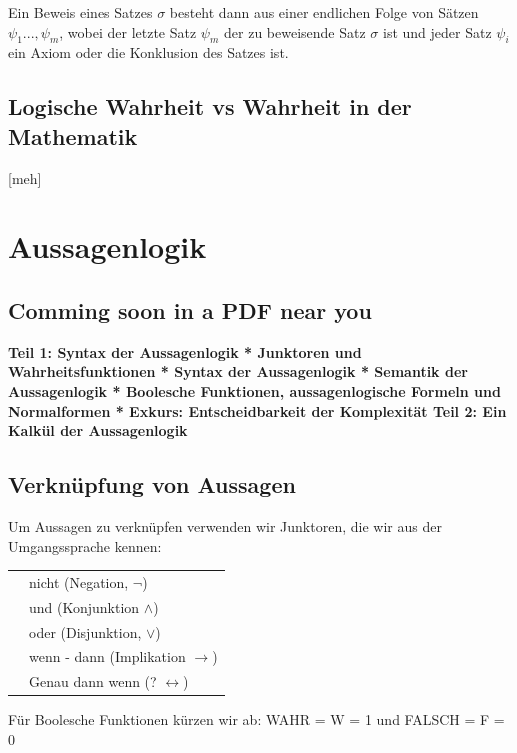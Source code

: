 \documentclass[12pt,a4paper]{article} %
\begin{document}
Ein Beweis eines Satzes $\sigma$ besteht dann aus einer endlichen Folge von Sätzen $\psi_1..., \psi_m$, wobei der letzte Satz $\psi_m$ der zu beweisende Satz $\sigma$ ist und jeder Satz $\psi_i$ ein Axiom oder die Konklusion des Satzes ist.

\subsection{Logische Wahrheit vs Wahrheit in der Mathematik}
[meh]

\section{Aussagenlogik}

\subsection{Comming soon in a PDF near you}
\bfseries{Teil 1: Syntax der Aussagenlogik} \newline
* Junktoren und Wahrheitsfunktionen\newline
* Syntax der Aussagenlogik \newline
* Semantik der Aussagenlogik \newline
* Boolesche Funktionen, aussagenlogische Formeln und Normalformen \newline
* Exkurs: Entscheidbarkeit der Komplexität \newline
\bfseries{Teil 2: Ein Kalkül der Aussagenlogik} \newline
[meh]

\subsection{Verknüpfung von Aussagen}
Um Aussagen zu verknüpfen verwenden wir Junktoren, die wir aus der Umgangssprache kennen:
\begin{tabular}{l l}
	& nicht (Negation, $\neg$) \\
	& und (Konjunktion $\wedge$) \\
	& oder (Disjunktion, $\vee$) \\
	& wenn - dann (Implikation $\rightarrow$) \\
	& Genau dann wenn (? $\leftrightarrow$)
\end{tabular}

Für Boolesche Funktionen kürzen wir ab: \newline
WAHR = W = 1 und FALSCH = F = 0
\end{document}
